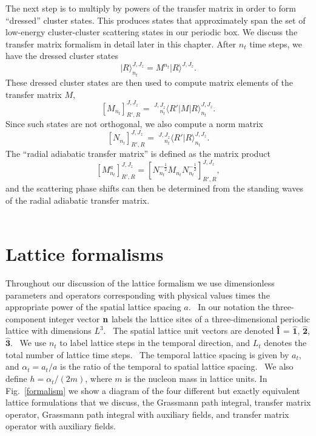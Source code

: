 The next step is to multiply by powers of the transfer matrix in order to
form ``dressed'' cluster
states. This produces states that approximately span the set of low-energy cluster-cluster scattering
states in our periodic box. We discuss the transfer matrix formalism in detail later in this chapter. After $n_t$ time steps, we have the dressed cluster
states 
%
\begin{equation}
\vert R\rangle^{J,J_z}_{n_t} = M^{n_t}|R\rangle^{J,J_z}.
\end{equation}
%
These dressed cluster states are then used to compute matrix
elements of the transfer matrix $M$,
%
\begin{equation}
\left[M_{n_t}\right]^{J,J_z}_{R',R} =\ ^{J,J_z}_{\!\!\!\!\!\quad{n_t}}\langle
R'\vert M \vert R\rangle^{J,J_z}_{n_t}.
\label{Hmatrix}
\end{equation}
%
Since such states are not orthogonal, we also compute a norm
matrix
% 
\begin{equation}
\left[N_{n_t}\right]^{J,J_z}_{R',R} =\ ^{J,J_z}_{\!\!\!\!\!\quad{n_t}}\langle
R'\vert R\rangle^{J,J_z}_{n_t}. 
\label{eqn:norm}
\end{equation}
%
The ``radial adiabatic transfer matrix'' is defined as the matrix product
%
\begin{equation}
\left[ {M^a_{n_t}} \right]^{J,J_z}_{R',R} = 
\left[N_{n_t}^{-\frac{1}{2}}M_{n_t}
N_{n_t}^{-\frac{1}{2}} \right]^{J,J_z}_{R',R},
\label{eqn:Adiabatic-Hamiltonian}
\end{equation}
%
and the scattering phase shifts can then be determined from the standing waves
of the radial adiabatic transfer matrix.  
\\
\\     

\section{Lattice formalisms}

Throughout our discussion of the lattice formalism we use dimensionless
parameters and operators corresponding with physical values times
the
appropriate power of the spatial lattice spacing $a$. \ In our notation the
three-component integer vector ${\bf n}$ labels the lattice sites of a
three-dimensional periodic lattice with dimensions $L^{3}$. \ The spatial
lattice unit vectors are denoted $\boldsymbol{\hat{\bf l}}$ = $\boldsymbol{\hat{1}}$,
$\boldsymbol{\hat{2}}$, $\boldsymbol{\hat{3}}$.
\ We
use $n_t$ to label lattice steps in the temporal direction, and $L_{t}$
denotes the total number of lattice time steps. \ The temporal lattice spacing
is given by $a_{t}$, and $\alpha_{t}=a_{t}/a$ is the ratio of the temporal
to
spatial lattice spacing. \ We also define $h=\alpha_{t}/(2m)$, where $m$
is
the nucleon mass in lattice units.  In Fig.~\ref{formalism} we show a diagram
of the four different but exactly equivalent lattice formulations that we
discuss, the Grassmann path integral, transfer matrix operator, Grassmann
path integral with auxiliary fields, and transfer matrix operator with auxiliary
fields.

